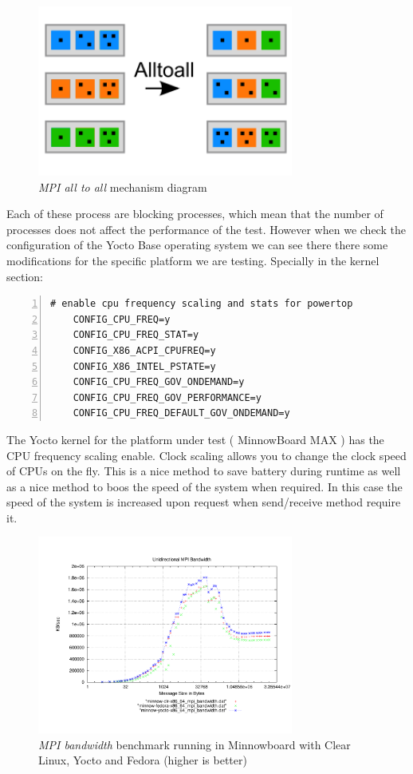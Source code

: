 \begin{figure}[H]
\centering
\includegraphics[width=0.75\textwidth]{images/mpi_all_to_all.png}
\caption{\textit{MPI all to all} mechanism diagram}
\label{mpi_all_to_all_example}
\end{figure}

Each of these process are blocking processes, which mean that the number of
processes does not affect the performance of the test. However when we check
the configuration of the Yocto Base operating system we can see there there
some modifications for the specific platform we are testing. Specially in the
kernel section: 

\begin{lstlisting}[frame=single,numbers=left]
    # enable cpu frequency scaling and stats for powertop
    CONFIG_CPU_FREQ=y
    CONFIG_CPU_FREQ_STAT=y
    CONFIG_X86_ACPI_CPUFREQ=y
    CONFIG_X86_INTEL_PSTATE=y
    CONFIG_CPU_FREQ_GOV_ONDEMAND=y
    CONFIG_CPU_FREQ_GOV_PERFORMANCE=y
    CONFIG_CPU_FREQ_DEFAULT_GOV_ONDEMAND=y
\end{lstlisting}

The Yocto kernel for the platform under test ( MinnowBoard MAX ) has the CPU
frequency scaling enable. Clock scaling allows you to change the clock speed of
CPUs on the fly. This is a nice method to save battery during runtime as well
as a nice method to boos the speed of the system when required. In this case
the speed of the system is increased upon request when send/receive method
require it.

\begin{figure}[H]
\centering
\includegraphics[width=0.75\textwidth]{images/mpbench_yocto_experiments/mpi_bandwidth.pdf}
\caption{\textit{MPI bandwidth} benchmark running in Minnowboard with Clear Linux,
Yocto and Fedora (higher is better)}
\label{mpi_bandwidth_yocto}
\end{figure}


